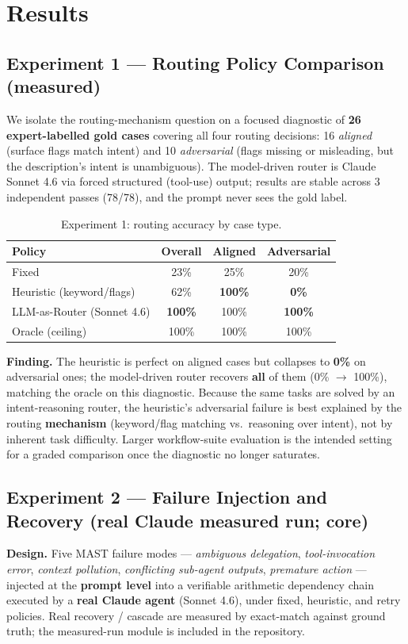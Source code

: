 \documentclass[sigconf,nonacm,anonymous]{acmart}  %
\begin{document}
\section{Results}
\label{sec:results}
\subsection{Experiment 1 --- Routing Policy Comparison (measured)}
We isolate the routing-mechanism question on a focused diagnostic of
\textbf{26 expert-labelled gold cases} covering all four routing decisions: 16
\emph{aligned} (surface flags match intent) and 10 \emph{adversarial} (flags
missing or misleading, but the description's intent is unambiguous). The
model-driven router is Claude Sonnet 4.6 via forced structured (tool-use) output;
results are stable across 3 independent passes (78/78), and the prompt never sees
the gold label.

\begin{table}[t]
\centering
\caption{Experiment 1: routing accuracy by case type.}
\label{tab:exp1}
\small
\begin{tabular}{@{}lccc@{}}
\toprule
\textbf{Policy} & \textbf{Overall} & \textbf{Aligned} & \textbf{Adversarial} \\
\midrule
Fixed & 23\% & 25\% & 20\% \\
Heuristic (keyword/flags) & 62\% & \textbf{100\%} & \textbf{0\%} \\
LLM-as-Router (Sonnet 4.6) & \textbf{100\%} & 100\% & \textbf{100\%} \\
Oracle (ceiling) & 100\% & 100\% & 100\% \\
\bottomrule
\end{tabular}
\end{table}

\textbf{Finding.} The heuristic is perfect on aligned cases but collapses to
\textbf{0\%} on adversarial ones; the model-driven router recovers \textbf{all} of
them (0\% $\to$ 100\%), matching the oracle on this diagnostic. Because the same
tasks are solved by an intent-reasoning router, the heuristic's adversarial
failure is best explained by the routing \textbf{mechanism} (keyword/flag
matching vs.\ reasoning over intent), not by inherent task difficulty. Larger
workflow-suite evaluation is the intended setting for a graded comparison once
the diagnostic no longer saturates.

\subsection{Experiment 2 --- Failure Injection and Recovery (real Claude
measured run; core)}
\textbf{Design.} Five MAST failure modes --- \emph{ambiguous delegation},
\emph{tool-invocation error}, \emph{context pollution}, \emph{conflicting
sub-agent outputs}, \emph{premature action} --- injected at the \textbf{prompt
level} into a verifiable arithmetic dependency chain executed by a \textbf{real
Claude agent} (Sonnet 4.6), under fixed, heuristic, and retry policies. Real
recovery / cascade are measured by exact-match against ground truth; the
measured-run module is included in the repository.
\end{document}
